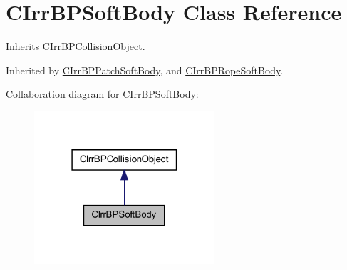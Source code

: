 \hypertarget{class_c_irr_b_p_soft_body}{
\section{CIrrBPSoftBody Class Reference}
\label{class_c_irr_b_p_soft_body}
}


Inherits \hyperlink{class_c_irr_b_p_collision_object}{CIrrBPCollisionObject}.



Inherited by \hyperlink{class_c_irr_b_p_patch_soft_body}{CIrrBPPatchSoftBody}, and \hyperlink{class_c_irr_b_p_rope_soft_body}{CIrrBPRopeSoftBody}.



Collaboration diagram for CIrrBPSoftBody:\nopagebreak
\begin{figure}[H]
\begin{center}
\leavevmode
\includegraphics[width=190pt]{class_c_irr_b_p_soft_body__coll__graph}
\end{center}
\end{figure}
